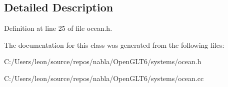 \subsection{Detailed Description}


Definition at line 25 of file ocean.\+h.



The documentation for this class was generated from the following files\+:\begin{DoxyCompactItemize}
\item 
C\+:/\+Users/leon/source/repos/nabla/\+Open\+G\+L\+T6/systems/ocean.\+h\item 
C\+:/\+Users/leon/source/repos/nabla/\+Open\+G\+L\+T6/systems/ocean.\+cc\end{DoxyCompactItemize}
